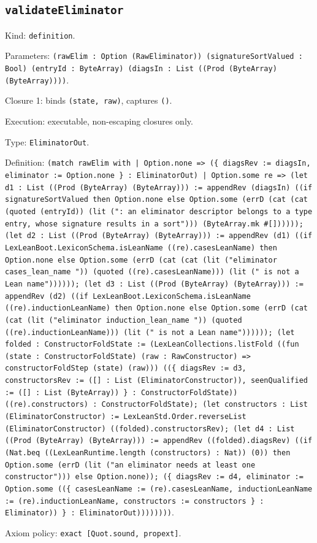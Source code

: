 \documentclass[11pt]{article}
\begin{document}
\subsection*{\texttt{validateEliminator}}
\noindent Kind: \texttt{definition}.\par
\noindent Parameters: \texttt{(rawElim : Option (RawEliminator)) (signatureSortValued : Bool) (entryId : ByteArray) (diagsIn : List ((Prod (ByteArray) (ByteArray))))}.\par
\noindent Closure 1: binds \texttt{(state, raw)}, captures \texttt{()}.\par
\noindent Execution: executable, non-escaping closures only.\par
\noindent Type: \texttt{EliminatorOut}.\par
\noindent Definition: \texttt{(match rawElim with | Option.none => (\{ diagsRev := diagsIn, eliminator := Option.none \} : EliminatorOut) | Option.some re => (let d1 : List ((Prod (ByteArray) (ByteArray))) := appendRev (diagsIn) ((if signatureSortValued then Option.none else Option.some (errD (cat (cat (quoted (entryId)) (lit (": an eliminator descriptor belongs to a type entry, whose signature results in a sort"))) (ByteArray.mk \#[]))))); (let d2 : List ((Prod (ByteArray) (ByteArray))) := appendRev (d1) ((if LexLeanBoot.LexiconSchema.isLeanName ((re).casesLeanName) then Option.none else Option.some (errD (cat (cat (lit ("eliminator cases\_lean\_name ")) (quoted ((re).casesLeanName))) (lit (" is not a Lean name")))))); (let d3 : List ((Prod (ByteArray) (ByteArray))) := appendRev (d2) ((if LexLeanBoot.LexiconSchema.isLeanName ((re).inductionLeanName) then Option.none else Option.some (errD (cat (cat (lit ("eliminator induction\_lean\_name ")) (quoted ((re).inductionLeanName))) (lit (" is not a Lean name")))))); (let folded : ConstructorFoldState := (LexLeanCollections.listFold ((fun (state : ConstructorFoldState) (raw : RawConstructor) => constructorFoldStep (state) (raw))) ((\{ diagsRev := d3, constructorsRev := ([] : List (EliminatorConstructor)), seenQualified := ([] : List (ByteArray)) \} : ConstructorFoldState)) ((re).constructors) : ConstructorFoldState); (let constructors : List (EliminatorConstructor) := LexLeanStd.Order.reverseList (EliminatorConstructor) ((folded).constructorsRev); (let d4 : List ((Prod (ByteArray) (ByteArray))) := appendRev ((folded).diagsRev) ((if (Nat.beq ((LexLeanRuntime.length (constructors) : Nat)) (0)) then Option.some (errD (lit ("an eliminator needs at least one constructor"))) else Option.none)); (\{ diagsRev := d4, eliminator := Option.some ((\{ casesLeanName := (re).casesLeanName, inductionLeanName := (re).inductionLeanName, constructors := constructors \} : Eliminator)) \} : EliminatorOut))))))))}.\par
\noindent Axiom policy: \texttt{exact [Quot.sound, propext]}.\par
\end{document}

